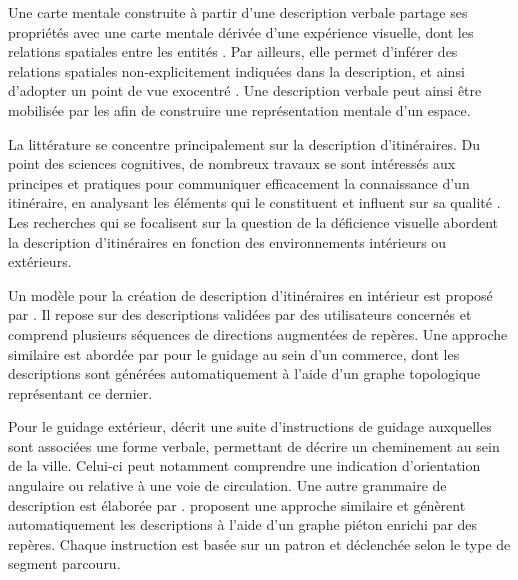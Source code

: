 


Une carte mentale construite à partir d'une description verbale partage ses propriétés avec une carte mentale dérivée d'une expérience visuelle, dont les relations spatiales entre les entités \cite{Denis1992}. Par ailleurs, elle permet d'inférer des relations spatiales non-explicitement indiquées dans la description, et ainsi d'adopter un point de vue exocentré \cite{Avraamides2004}. Une description verbale peut ainsi être mobilisée par les \pcdvs{} afin de construire une représentation mentale d'un espace.

\newpar{}


La littérature se concentre principalement sur la description d'itinéraires. Du point des sciences cognitives, de nombreux travaux se sont intéressés aux principes et pratiques pour communiquer efficacement la connaissance d’un itinéraire, en analysant les éléments qui le constituent et influent sur sa qualité \cite{Allen2000,Lovelace1999}. Les recherches qui se focalisent sur la question de la déficience visuelle abordent la description d'itinéraires en fonction des environnements intérieurs ou extérieurs.

Un modèle pour la création de description d'itinéraires en intérieur est proposé par \cite{Troeger2020}. Il repose sur des descriptions validées par des utilisateurs concernés et comprend plusieurs séquences de directions augmentées de repères. Une approche similaire est abordée par \cite{Kulyukin2008} pour le guidage au sein d'un commerce, dont les descriptions sont générées automatiquement à l'aide d'un graphe topologique représentant ce dernier.

Pour le guidage extérieur, \cite{gaunet_verbal_2006} décrit une suite d’instructions de guidage auxquelles sont associées une forme verbale, permettant de décrire un cheminement au sein de la ville. Celui-ci peut notamment comprendre une indication d’orientation angulaire ou relative à une voie de circulation. Une autre grammaire de description est élaborée par \cite{Constantinescu2019}. \cite{Balata2016} proposent une approche similaire et génèrent automatiquement les descriptions à l'aide d'un graphe piéton enrichi par des repères. Chaque instruction est basée sur un patron et déclenchée selon le type de segment parcouru.

